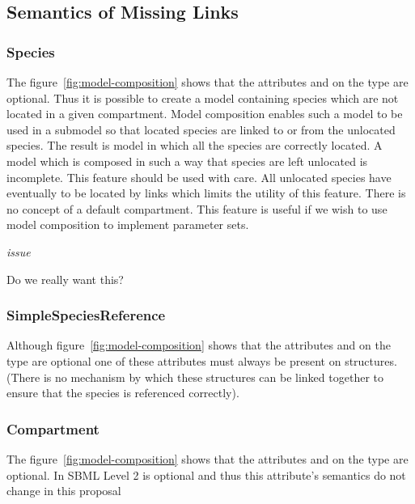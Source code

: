 \documentclass{cekarticle}
\begin{document}
\subsection{Semantics of Missing Links}
\label{sec:missinglinks}

\subsubsection{Species}

The figure~\ref{fig:model-composition} shows that the attributes  and 
on the  type are optional.  Thus it is possible to create a model containing species which are not
located in a given compartment.  Model composition enables such a model to be used in a submodel so that located
species are linked to or from the unlocated species.  The result is model in which all the species are correctly located.
A model which is composed in such a way that species are left unlocated is incomplete.  This feature should
be used with care.  All unlocated species have eventually to be located by links which limits the utility of this feature.
There is no concept of a default compartment.  This feature is useful if we wish to use model composition to implement
parameter sets.

\emph{issue}

Do we really want this?

\subsubsection{SimpleSpeciesReference}

Although figure~\ref{fig:model-composition} shows that the attributes  and 
on the  type are optional one of these attributes must always be present on
structures.  (There is no mechanism by which these structures can be linked together to ensure that the species
is referenced correctly).

\subsubsection{Compartment}

The figure~\ref{fig:model-composition} shows that the attributes  and 
on the  type are optional.  In SBML Level 2  is optional and thus
this attribute's semantics do not change in this proposal
\end{document}
